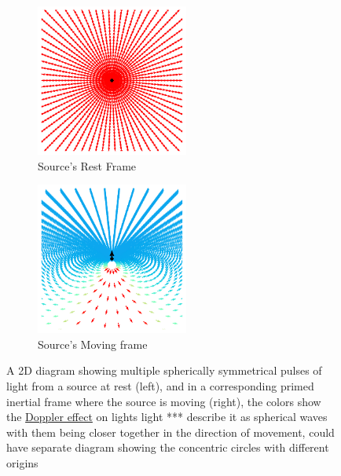 \begin{figure}[H]
	\begin{subfigure}{.49\textwidth}
		\centering
		\includegraphics[width = 5cm]{images/pdf/Field_Rest_Frame.pdf}
		\caption{Source's Rest Frame}
	\end{subfigure}
	\begin{subfigure}{.49\textwidth}
		\centering
		\includegraphics[width = 5cm]{images/pdf/Field_Moving_Frame_Doppler.pdf}
		\caption{Source's Moving frame}
	\end{subfigure}
	\caption{A 2D diagram showing multiple spherically symmetrical pulses of light from a source at rest (left), and in a corresponding primed inertial frame where the source is moving (right), the colors show the \protect\hyperlink{def-doppler-effect}{Doppler effect} on lights light *** describe it as spherical waves with them being closer together in the direction of movement, could have separate diagram showing the concentric circles with different origins}
	\label{fig: full field transformation}
\end{figure}



\printbibliography[segment=\therefsegment, heading=subbibliography]

